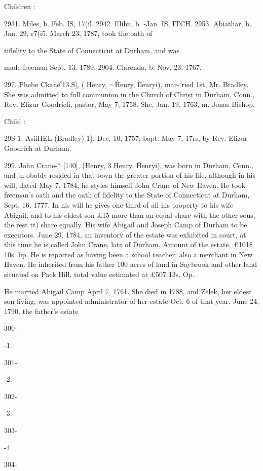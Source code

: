\documentclass{book}
\begin{document}
Children : 

2931. Miles, b. Feb. IS, 17(il. 
2942. Elihu, b. -Jan. IS, ITCH. 
2953. Abiathar, b. Jan. 29, r7(i5. March 23, 1787, took the oath of 

tiflelity to the State of Connecticut at Dnrham, and was 

made freeman Sept. 13. 1789. 
2904. Clarenda, b. Nov. 23, 1767. 

297. Phebe Ckane\^ [13.S], ( Henry, =\^ Henry, \^ Ilenryi), mar- 
ried 1st, Mr. Bradley. She was admitted to full communion in 
the Church of Christ in Durham, Conn., Rev. Elizur Goodricli, 
pastor, May 7, 1758. She, Jan. 19, 1763, m. Jonas Bishop. 

Child : 

29S 1. AsiiHEL (Bradley) 1). Dec. 10, 1757; bapt. May 7, 17rs, by 
Rev. Elizur Goodrich at Durham. 

299. John Crane-* [140], (Henry, 3 Henry, \^ Henryi), was 
born in Durham, Conn., and jn-obably resided in that town the 
greater portion of his life, although in his will, dated May 7, 
1784, he styles himself John Crane of New Haven. He took 
freeman's oath and the oath of fidelity to the State of Connecticut 
at Durham, Sept. 16, 1777. In his will he gives one-third of all 
his property to his wife Abigail, and to his eldest son £15 more 
than an equal share with the other sous, the rest tt) share equally. 
His wife Abigail and Joseph Camp of Durham to be executors. 
June 29, 1784, an inventory of the estate was exhibited in court, 
at this time he is called John Crane, late of Durham. Amount 
of the estate, £1018 10s.  lip. He is reported as having been 
a school teacher, also a merchant in New Haven. He inherited 
from his father 100 acres of land in Saybrook and other land 
situated on Pack Hill, total value estimated at £507  13s.  Op. 

He married Abigail Camp April 7, 1761. She died in 1788, and 
Zelek, her eldest son living, was appointed administrator of her 
estate Oct. 6 of that year. June 24, 1790, the father's estate 



300- 


-1. 


301- 


-2. 


302- 


-3. 


303- 


-4. 


304- 
\end{document}
